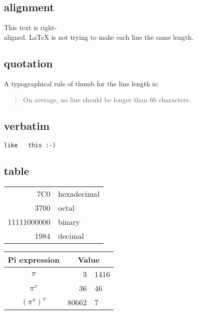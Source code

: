 \documentclass[10pt,a4paper]{article}
\begin{document}
\subsection{alignment}
\begin{flushright}
This text is right-\\aligned.
\LaTeX{} is not trying to make
each line the same length.
\end{flushright}


\subsection{quotation}
A typographical rule of thumb
for the line length is:
\begin{quote}
On average, no line should
be longer than 66 characters.
\end{quote}


\subsection{verbatim}
\verb|like   this :-) |


\subsection{table}
\begin{tabular}{|r|l|}
\hline
7C0 & hexadecimal \\
3700 & octal \\ \cline{2-2}
11111000000 & binary \\
\hline \hline
1984 & decimal \\
\hline
\end{tabular}

\begin{tabular}{c r @{.} l} 
Pi expression 
& 
\multicolumn{2}{c}{Value} \\ 
\hline 
$\pi$ 
& 3&1416 \\ 
$\pi^{\pi}$ 
& 36&46 
\\ 
$(\pi^{\pi})^{\pi}$ & 80662&7 \\ 
\end{tabular} 
\end{document}
